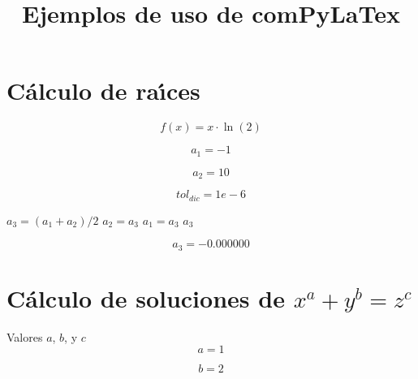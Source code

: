 \documentclass{article}
\title{Ejemplos de uso de comPyLaTex}
\author{}
\date{}
\begin{document}
\maketitle


\section{C\'alculo de ra\'{\i}ces}

\begin{equation}
f(x) = x \cdot \ln(2)
\label{eq:calc:f}
\end{equation}

\begin{equation}
a_1 = -1
\label{eq:calc:a1}
\end{equation}

\begin{equation}
a_2 = 10
\label{eq:calc:a2}
\end{equation}

\begin{equation}
    tol_{dic} = 1e-6
    \label{eq:calc:toldic}
\end{equation}

\begin{algorithm}
\caption{M\'etodo de dicotom\'{\i}a}
\label{alg:calc:a3}
\begin{algorithmic}
        \STATE $a_3 = (a_1 + a_2)/2$
            \STATE $a_2 = a_3$
        \ELSE
            \STATE $a_1 = a_3$
        \ENDIF
    \ENDWHILE
    \RETURN $a_3$
\end{algorithmic}
\end{algorithm}


\begin{equation}
    a_3 = 
    -0.000000
    \label{eq:res:a3}
\end{equation}


\section{C\'alculo de soluciones de $x^a + y^b = z^c$}

Valores $a$, $b$, y $c$
\begin{equation}
a = 1
\label{eq:calc:a}
\end{equation}

\begin{equation}
b = 2
\label{eq:calc:b}
\end{equation}
\end{document}
